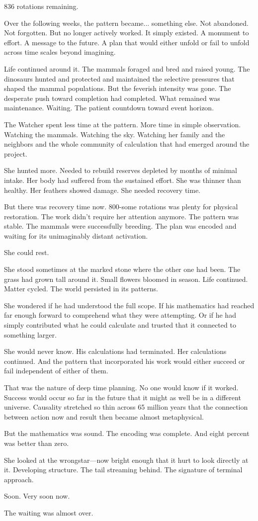 836 rotations remaining.

\scenebreak

Over the following weeks, the pattern became... something else. Not abandoned. Not forgotten. But no longer actively worked. It simply existed. A monument to effort. A message to the future. A plan that would either unfold or fail to unfold across time scales beyond imagining.

Life continued around it. The mammals foraged and bred and raised young. The dinosaurs hunted and protected and maintained the selective pressures that shaped the mammal populations. But the feverish intensity was gone. The desperate push toward completion had completed. What remained was maintenance. Waiting. The patient countdown toward event horizon.

The Watcher spent less time at the pattern. More time in simple observation. Watching the mammals. Watching the sky. Watching her family and the neighbors and the whole community of calculation that had emerged around the project.

She hunted more. Needed to rebuild reserves depleted by months of minimal intake. Her body had suffered from the sustained effort. She was thinner than healthy. Her feathers showed damage. She needed recovery time.

But there was recovery time now. 800-some rotations was plenty for physical restoration. The work didn't require her attention anymore. The pattern was stable. The mammals were successfully breeding. The plan was encoded and waiting for its unimaginably distant activation.

She could rest.

She stood sometimes at the marked stone where the other one had been. The grass had grown tall around it. Small flowers bloomed in season. Life continued. Matter cycled. The world persisted in its patterns.

She wondered if he had understood the full scope. If his mathematics had reached far enough forward to comprehend what they were attempting. Or if he had simply contributed what he could calculate and trusted that it connected to something larger.

She would never know. His calculations had terminated. Her calculations continued. And the pattern that incorporated his work would either succeed or fail independent of either of them.

That was the nature of deep time planning. No one would know if it worked. Success would occur so far in the future that it might as well be in a different universe. Causality stretched so thin across 65 million years that the connection between action now and result then became almost metaphysical.

But the mathematics was sound. The encoding was complete. And eight percent was better than zero.

She looked at the wrongstar—now bright enough that it hurt to look directly at it. Developing structure. The tail streaming behind. The signature of terminal approach.

Soon. Very soon now.

The waiting was almost over.


